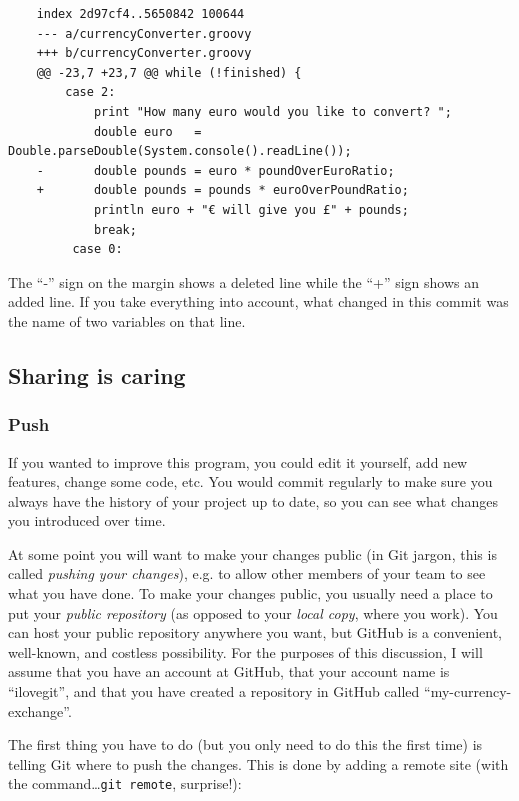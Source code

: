 \begin{verbatim}
    index 2d97cf4..5650842 100644
    --- a/currencyConverter.groovy
    +++ b/currencyConverter.groovy
    @@ -23,7 +23,7 @@ while (!finished) {
        case 2: 
            print "How many euro would you like to convert? ";
            double euro   = Double.parseDouble(System.console().readLine());
    -       double pounds = euro * poundOverEuroRatio;
    +       double pounds = pounds * euroOverPoundRatio;
            println euro + "€ will give you £" + pounds;
            break;
         case 0:  
\end{verbatim}

The ``-'' sign on the margin shows a deleted line while the ``+'' sign
shows an added line. If you take everything into account, what changed
in this commit was the name of two variables on that line. 

\subsection{Sharing is caring}
\label{sec:sharing-caring}

\subsubsection{Push}
\label{sec:push}

If you wanted to improve this program, you could edit it yourself, add
new features, change some code, etc. You would commit regularly to
make sure you always have the history of your project up to date, so
you can see what changes you introduced over time. 

At some point you will want to make your changes public (in Git
jargon, this is called \emph{pushing your changes}), e.g. to allow
other members of your team to see what you have done. To make your
changes public, you usually need a place to put your \emph{public
repository} (as opposed to your \emph{local copy}, where you
work). You can host your public repository anywhere you want, but
GitHub is a convenient, well-known, and costless possibility. For the
purposes of this discussion, I will assume that you have an account at
GitHub, that your account name is ``ilovegit'', and that you have
created a repository in GitHub called ``my-currency-exchange''. 

The first thing you have to do (but you only need to do this the first
time) is telling Git where to push the changes. This is done by adding
a remote site (with the command\ldots \verb+git remote+, surprise!):

